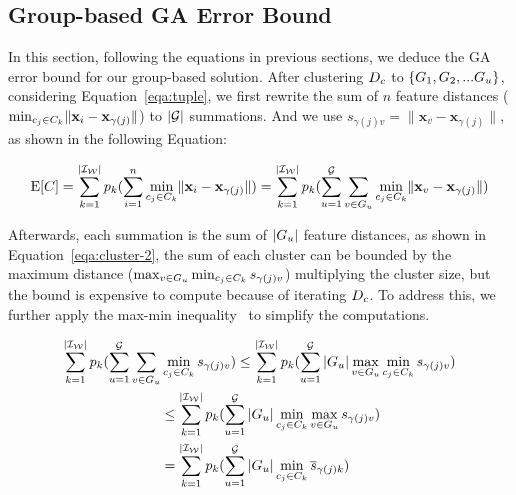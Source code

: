 




\subsection{Group-based GA Error Bound}

In this section, following the equations in previous sections, we deduce the GA error bound for our group-based solution. 
%
After clustering $D_c$ to $\{ G_1 , G_2, ...G_u\}$, considering Equation~\ref{eqa:tuple}, we  first rewrite the sum of $n$ feature distances (\ie $\min_{c_j\in C_k}\lVert\mathbf{x}_i - \mathbf{x}_{\gamma(j)}\rVert$) to   $|\mathcal{G}|$ summations. And we use $s_{\gamma(j)v} = \lVert\mathbf{x}_v - \mathbf{x}_{\gamma(j)}\rVert$, as shown in the following Equation:

\begin{equation}\label{eqa:cluster-1}
    \mathrm{E}[C] = \sum_{k= 1}^{|\mathcal{I_W}|} p_k (\sum_{i=1}^n \min_{c_j\in C_k}\lVert\mathbf{x}_i - \mathbf{x}_{\gamma(j)}\rVert) =  \sum_{k= 1}^{|\mathcal{I_W}|} p_k (\sum_{u=1}^{\mathcal{G}}\sum_{v \in G_u} \min_{c_j\in C_k}\lVert\mathbf{x}_v - \mathbf{x}_{\gamma(j)}\rVert)
\end{equation}

Afterwards, each summation is the sum of $|G_u|$ feature distances, as shown in Equation~\ref{eqa:cluster-2},  the sum of each cluster can be bounded by  the maximum distance ($\max_{v \in G_u} \min_{c_j\in C_k} s_{\gamma(j)v}$)  multiplying the  cluster size, but the bound is expensive to compute because of iterating $D_c$. To address this, we further apply the max-min inequality~\cite{} to simplify the computations. 


\begin{equation}\label{eqa:cluster-2}
    \begin{aligned}
        \sum_{k= 1}^{|\mathcal{I_W}|} p_k (\sum_{u=1}^{\mathcal{G}}\sum_{v \in G_u} & \min_{c_j\in C_k} s_{\gamma(j)v}) \leq \sum_{k= 1}^{|\mathcal{I_W}|} p_k (\sum_{u=1}^{\mathcal{G}} |G_u| \max_{v \in G_u} \min_{c_j\in C_k}s_{\gamma(j)v}) \\
        & \leq \sum_{k= 1}^{|\mathcal{I_W}|} p_k (\sum_{u=1}^{\mathcal{G}} |G_u| \min_{c_j\in C_k} \max_{v \in G_u}s_{\gamma(j)v}) \\
        & =  \sum_{k= 1}^{|\mathcal{I_W}|} p_k (\sum_{u=1}^{\mathcal{G}} |G_u| \min_{c_j\in C_k} \overline{s}_{\gamma(j)k})
    \end{aligned}
\end{equation}



